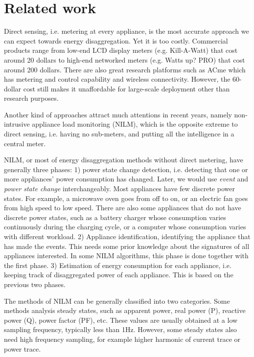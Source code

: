 \chapter{Related work}\label{chap2}

Direct sensing, i.e. metering at every appliance, is the most accurate approach we can expect towards energy disaggregation. Yet it is too costly. Commercial products range from low-end LCD display meters (e.g. Kill-A-Watt) that cost around 20 dollars to high-end networked meters (e.g. Watts up? PRO) that cost around 200 dollars. There are also great research platforms such as ACme \cite{Jiang2009} which has metering and control capability and wireless connectivity. However, the 60-dollar cost still makes it unaffordable for large-scale deployment other than research purposes. 

Another kind of approaches attract much attentions in recent years, namely non-intrusive appliance load monitoring (NILM), which is the opposite extreme to direct sensing, i.e. having no sub-meters, and putting all the intelligence in a central meter. 

NILM, or most of energy disaggregation methods without direct metering, have generally three phases: 1) power state change detection, i.e. detecting that one or more appliances' power consumption has changed. Later, we would use \textit{event} and \textit{power state change} interchangeably. Most appliances have few discrete power states. For example, a microwave oven goes from off to on, or an electric fan goes from high speed to low speed. There are also some appliances that do not have discrete power states, such as a battery charger whose consumption varies continuously during the charging cycle, or a computer whose consumption varies with different workload. 2) Appliance identification,  identifying the appliance that has made the events. This needs some prior knowledge about the signatures of all appliances interested. In some NILM algorithms, this phase is done together with the first phase. 3) Estimation of energy consumption for each appliance, i.e. keeping track of disaggregated power of each appliance. This is based on the previous two phases.

The methods of NILM can be generally classified into two categories. Some methods analysis  steady states, such as apparent power, real power (P), reactive power (Q), power factor (PF), etc. These values are usually obtained at a low sampling frequency, typically less than 1Hz. However, some steady states also need high frequency sampling, for example higher harmonic of current trace or power trace. 

